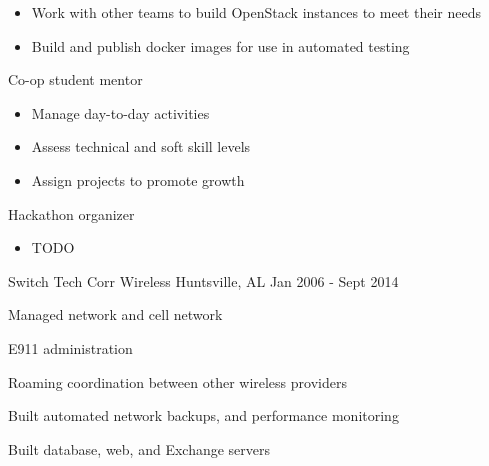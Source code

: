\begin{cventries}
{\begin{cvitems}
\begin{itemize}
                \item {Work with other teams to build OpenStack instances to meet their needs}
                \item {Build and publish docker images for use in automated testing}
            \end{itemize}
        \item {Co-op student mentor}
            \begin{itemize}
                \item {Manage day-to-day activities}
                \item {Assess technical and soft skill levels}
                \item {Assign projects to promote growth}
            \end{itemize}
        \item {Hackathon organizer}
            \begin{itemize}
                \item {TODO}
            \end{itemize}
      \end{cvitems}
    }

  \cventry
    {Switch Tech} %
    {Corr Wireless} %
    {Huntsville, AL} %
    {Jan 2006 - Sept 2014} %
    {
      \begin{cvitems} %
        \item {Managed network and cell network}
        \item {E911 administration}
        \item {Roaming coordination between other wireless providers}
        \item {Built automated network backups, and performance monitoring}
        \item {Built database, web, and Exchange servers}
      \end{cvitems}
    }

\end{cventries}
